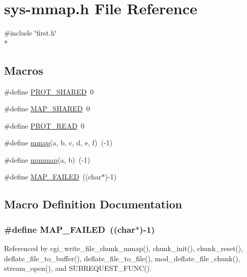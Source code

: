\hypertarget{sys-mmap_8h}{\section{sys-\/mmap.h File Reference}
\label{sys-mmap_8h}
}
{\ttfamily \#include \char`\"{}first.\-h\char`\"{}}\\*
\subsection*{Macros}
\begin{DoxyCompactItemize}
\item 
\#define \hyperlink{sys-mmap_8h_add91c44c535e724eb143036587437411}{P\-R\-O\-T\-\_\-\-S\-H\-A\-R\-E\-D}~0
\item 
\#define \hyperlink{sys-mmap_8h_a57028962c2a7c0c802ca6613492f2ef3}{M\-A\-P\-\_\-\-S\-H\-A\-R\-E\-D}~0
\item 
\#define \hyperlink{sys-mmap_8h_a15bf68ce8b590838b3a5c0b639d8d519}{P\-R\-O\-T\-\_\-\-R\-E\-A\-D}~0
\item 
\#define \hyperlink{sys-mmap_8h_a49aecedf10b98a15ec8688b2d9a92feb}{mmap}(a, b, c, d, e, f)~(-\/1)
\item 
\#define \hyperlink{sys-mmap_8h_a2426598a33e2c2b2decce3baa728bbc1}{munmap}(a, b)~(-\/1)
\item 
\#define \hyperlink{sys-mmap_8h_a8523dcf952f6ff059a3bed717e4f1296}{M\-A\-P\-\_\-\-F\-A\-I\-L\-E\-D}~((char$\ast$)-\/1)
\end{DoxyCompactItemize}


\subsection{Macro Definition Documentation}
\hypertarget{sys-mmap_8h_a8523dcf952f6ff059a3bed717e4f1296}{
\subsubsection[{M\-A\-P\-\_\-\-F\-A\-I\-L\-E\-D}]{\setlength{\rightskip}{0pt plus 5cm}\#define M\-A\-P\-\_\-\-F\-A\-I\-L\-E\-D~((char$\ast$)-\/1)}}\label{sys-mmap_8h_a8523dcf952f6ff059a3bed717e4f1296}


Referenced by cgi\-\_\-write\-\_\-file\-\_\-chunk\-\_\-mmap(), chunk\-\_\-init(), chunk\-\_\-reset(), deflate\-\_\-file\-\_\-to\-\_\-buffer(), deflate\-\_\-file\-\_\-to\-\_\-file(), mod\-\_\-deflate\-\_\-file\-\_\-chunk(), stream\-\_\-open(), and S\-U\-B\-R\-E\-Q\-U\-E\-S\-T\-\_\-\-F\-U\-N\-C().

